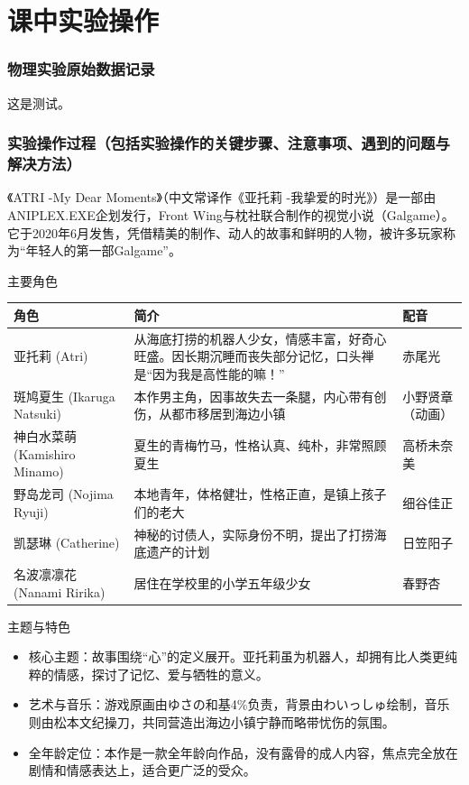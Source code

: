 \documentclass{SICNU_Experiment}
\begin{document}
\part{课中实验操作}
\section{\Large 物理实验原始数据记录}
这是测试。\newpage
\section{\Large 实验操作过程\mdseries \normalsize（包括实验操作的关键步骤、注意事项、遇到的问题与解决方法）}
《ATRI -My Dear Moments》（中文常译作《亚托莉 -我挚爱的时光》）是一部由ANIPLEX.EXE企划发行，Front Wing与枕社联合制作的视觉小说（Galgame）。它于2020年6月发售，凭借精美的制作、动人的故事和鲜明的人物，被许多玩家称为“年轻人的第一部Galgame”。


\noindent 主要角色\\
\begin{center}
\begin{tabular}{lp{6cm}l}
\hline
角色&简介&配音\\
\hline
\hline
亚托莉 (Atri)&从海底打捞的机器人少女，情感丰富，好奇心旺盛。因长期沉睡而丧失部分记忆，口头禅是“因为我是高性能的嘛！”&赤尾光\\
\hline
斑鸠夏生 (Ikaruga Natsuki)&本作男主角，因事故失去一条腿，内心带有创伤，从都市移居到海边小镇&小野贤章（动画）\\
\hline
神白水菜萌 (Kamishiro Minamo)&夏生的青梅竹马，性格认真、纯朴，非常照顾夏生&高桥未奈美\\
\hline
野岛龙司 (Nojima Ryuji)&本地青年，体格健壮，性格正直，是镇上孩子们的老大&细谷佳正\\
\hline
凯瑟琳 (Catherine)&神秘的讨债人，实际身份不明，提出了打捞海底遗产的计划&日笠阳子\\
\hline
名波凛凛花 (Nanami Ririka)&居住在学校里的小学五年级少女&春野杏\\
\hline
\end{tabular}
\end{center}
主题与特色
\begin{itemize}
\item 核心主题：故事围绕“心”的定义展开。亚托莉虽为机器人，却拥有比人类更纯粹的情感，探讨了记忆、爱与牺牲的意义。
\item 艺术与音乐：游戏原画由ゆさの和基4\%负责，背景由わいっしゅ绘制，音乐则由松本文纪操刀，共同营造出海边小镇宁静而略带忧伤的氛围。
\item 全年龄定位：本作是一款全年龄向作品，没有露骨的成人内容，焦点完全放在剧情和情感表达上，适合更广泛的受众。
\end{itemize}
\newpage
\end{document}
